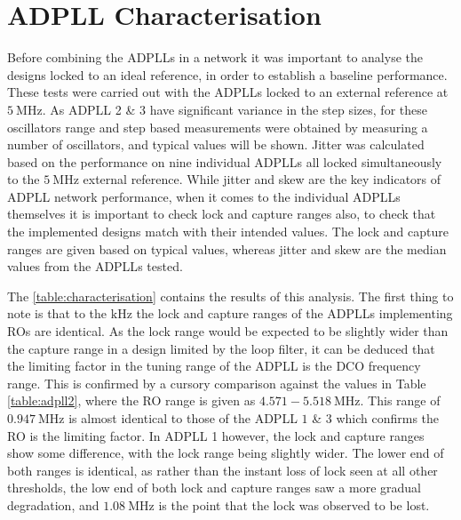 \section{\acs{ADPLL} Characterisation}
Before combining the \ac{ADPLL}s in a network it was important to analyse the designs locked to an ideal reference, in order to establish a baseline performance. These tests were carried out with the \ac{ADPLL}s locked to an external reference at $5~\si{\mega\hertz}$. As \ac{ADPLL} 2 \& 3 have significant variance in the step sizes, for these oscillators range and step based measurements were obtained by measuring a number of oscillators, and typical values will be shown. Jitter was calculated based on the performance on nine individual \ac{ADPLL}s all locked simultaneously to the $5~\si{\mega\hertz}$ external reference. While jitter and skew are the key indicators of \ac{ADPLL} network performance, when it comes to the individual \ac{ADPLL}s themselves it is important to check lock and capture ranges also, to check that the implemented designs match with their intended values. The lock and capture ranges are given based on typical values, whereas jitter and skew are the median values from the \ac{ADPLL}s tested.

The \ref{table:characterisation} contains the results of this analysis. The first thing to note is that to the $\si{\kilo\hertz}$ the lock and capture ranges of the \ac{ADPLL}s implementing \ac{RO}s are identical. As the lock range would be expected to be slightly wider than the capture range in a design limited by the loop filter, it can be deduced that the limiting factor in the tuning range of the \ac{ADPLL} is the \ac{DCO} frequency range. This is confirmed by a cursory comparison against the values in Table \ref{table:adpll2}, where the \ac{RO} range is given as $4.571-5.518~\si{\mega\hertz}$. This range of $0.947~\si{\mega\hertz}$ is almost identical to those of the \ac{ADPLL} $1$ \& $3$ which confirms the \ac{RO} is the limiting factor. In \ac{ADPLL} 1 however, the lock and capture ranges show some difference, with the lock range being slightly wider. The lower end of both ranges is identical, as rather than the instant loss of lock seen at all other thresholds, the low end of both lock and capture ranges saw a more gradual degradation, and $1.08~\si{\mega\hertz}$ is the point that the lock was observed to be lost.


